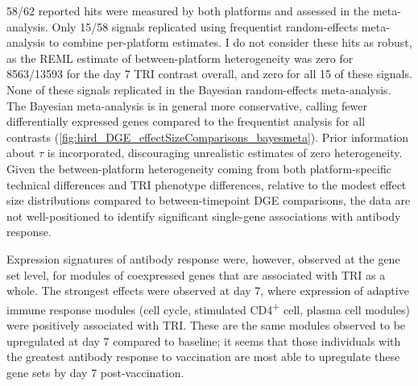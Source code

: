 58/62 reported hits were measured by both platforms and assessed in the meta-analysis.
Only 15/58 signals replicated using frequentist random-effects meta-analysis to combine per-platform estimates.
I do not consider these hits as robust, as the \gls{REML} estimate of between-platform heterogeneity was zero for 8563/13593 for the day 7 TRI contrast overall, and zero for all 15 of these signals.
None of these signals replicated in the Bayesian random-effects meta-analysis.
The Bayesian meta-analysis is in general more conservative, calling fewer differentially expressed genes compared to the frequentist analysis for all contrasts (\autoref{fig:hird_DGE_effectSizeComparisons_bayesmeta}).
Prior information about $\tau$ is incorporated, discouraging unrealistic estimates of zero heterogeneity.
Given the between-platform heterogeneity coming from both platform-specific technical differences and \gls{TRI} phenotype differences, relative to the modest effect size distributions compared to between-timepoint \gls{DGE} comparisons, the data are not well-positioned to identify significant single-gene associations with antibody response.
%

%

Expression signatures of antibody response were, however, observed at the gene set level, for modules of coexpressed genes that are associated with \gls{TRI} as a whole.
The strongest effects were observed at day 7, where expression of adaptive immune response modules (cell cycle, stimulated CD4\textsuperscript{+} cell, plasma cell modules) were positively associated with \gls{TRI}.
These are the same modules observed to be upregulated at day 7 compared to baseline; it seems that those individuals with the greatest antibody response to vaccination are most able to upregulate these gene sets by day 7 post-vaccination.

